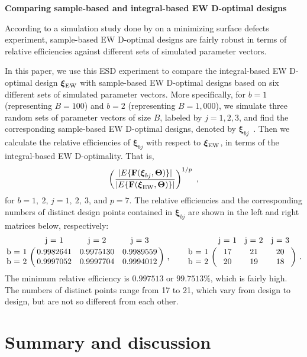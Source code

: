 \medskip
\noindent
{\bf Comparing sample-based and integral-based EW D-optimal designs}
\smallskip

\noindent
According to a simulation study done by \cite{lin2025ew} on a minimizing surface defects experiment, sample-based EW D-optimal designs are fairly robust in terms of relative efficiencies against different sets of simulated parameter vectors. 

In this paper, we use this ESD experiment to compare the integral-based EW D-optimal design $\boldsymbol{\xi}_{\rm EW}$ with sample-based EW D-optimal designs based on six different sets of simulated parameter vectors. More specifically, for $b=1$ (representing $B=100$) and $b=2$ (representing $B=1,000$), we simulate three random sets of parameter vectors of size $B$, labeled by $j=1,2,3$, and find the corresponding sample-based EW D-optimal designs, denoted by $\boldsymbol{\xi}_{bj}$~.
Then we calculate the relative efficiencies of $\boldsymbol{\xi}_{bj}$ with respect to $\boldsymbol{\xi}_{\rm EW}$, in terms of the integral-based EW D-optimality. 
That is,
\[
\left(\frac{|E\{{\mathbf F}(\boldsymbol{\xi}_{bj}, \boldsymbol{\Theta})\}|}{|E\{{\mathbf F}(\boldsymbol{\xi}_{\rm EW}, \boldsymbol{\Theta})\}|}\right)^{1/p}\ ,
\]
for $b = 1, \ 2$, $j = 1, \ 2,\ 3$, and $p = 7$. The relative efficiencies and the corresponding numbers of distinct design points contained in $\boldsymbol{\xi}_{bj}$ are shown in the left and right matrices below, respectively:
\[
\bordermatrix{
  & $j = 1$ & $j = 2$ & $j = 3$  \cr
$b = 1$ & 0.9982641 & 0.9975130 & 0.9989559 \cr
$b = 2$ & 0.9997052 & 0.9997704 & 0.9994012 \cr
}\ ,
\qquad
\bordermatrix{
  & $j = 1$ & $j = 2$ & $j = 3$  \cr
$b = 1$ & 17  & 21  & 20 \cr
$b = 2$ & 20  & 19  & 18 \cr
}\ .
\]
The minimum relative efficiency is $0.997513$ or $99.7513\%$, which is fairly high. The numbers of distinct points range from 17 to 21, which vary from design to design, but are not so different from each other.

\section{Summary and discussion} \label{sec:summary}

